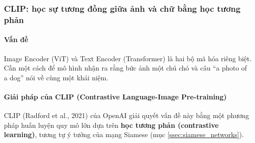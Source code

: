 \subsubsection{CLIP: học sự tương đồng giữa ảnh và chữ bằng học tương phản}
\paragraph{Vấn đề}
Image Encoder (ViT) và Text Encoder (Transformer) là hai bộ mã hóa riêng biệt. Cần một cách để mô hình nhận ra rằng bức ảnh một chú chó và câu “a photo of a dog” nói về cùng một khái niệm.

\paragraph{Giải pháp của CLIP (Contrastive Language-Image Pre-training)}
CLIP (Radford et al., 2021) của OpenAI giải quyết vấn đề này bằng một phương pháp huấn luyện quy mô lớn dựa trên \textbf{học tương phản (contrastive learning)}, tương tự ý tưởng của mạng Siamese (mục \ref{ssec:siamese_networks}).

